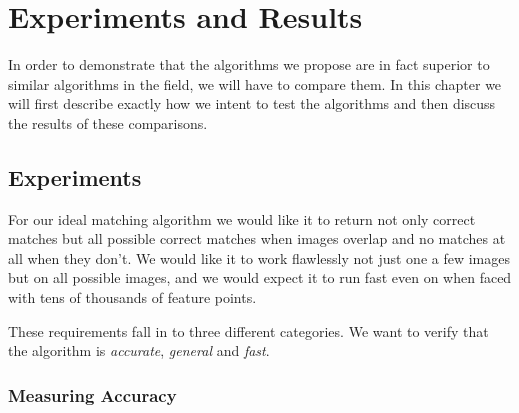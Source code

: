 \chapter{Experiments and Results}
\label{C:Experiments}

In order to demonstrate that the algorithms we propose are in fact 
superior to similar algorithms in the field, we will have to compare 
them. In this chapter we will first describe exactly how we intent to 
test the algorithms and then discuss the results of these comparisons.  

\section{Experiments}
For our ideal matching algorithm we would like it to return not only 
correct matches but all possible correct matches when images overlap and 
no matches at all when they don't.  We would like it to work flawlessly 
not just one a few images but on all possible images, and we would 
expect it to run fast even on when faced with tens of thousands of 
feature points.

These requirements fall in to three different categories. We want to 
verify that the algorithm is \emph{accurate}, \emph{general} and 
\emph{fast}.

\subsection{Measuring Accuracy}

